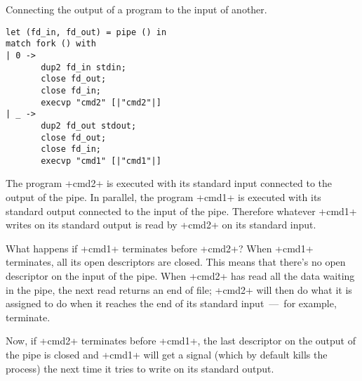 \begin{example} Connecting the output of a program to the input of another.
%
\begin{lstlisting}
let (fd_in, fd_out) = pipe () in
match fork () with
| 0 -> 
       dup2 fd_in stdin;
       close fd_out;
       close fd_in;
       execvp "cmd2" [|"cmd2"|]
| _ -> 
       dup2 fd_out stdout;
       close fd_out;
       close fd_in;
       execvp "cmd1" [|"cmd1"|]
\end{lstlisting}
%
The program \ml+cmd2+ is executed with its standard input connected to
the output of the pipe. In parallel, the program \ml+cmd1+ is executed
with its standard output connected to the input of the pipe. Therefore
whatever \ml+cmd1+ writes on its standard output is read by \ml+cmd2+
on its standard input.

What happens if \ml+cmd1+ terminates before \ml+cmd2+? When \ml+cmd1+
terminates, all its open descriptors are closed.  This means that there's no
open descriptor on the input of the pipe. When \ml+cmd2+ has read all
the data waiting in the pipe, the next read returns an end of file;
\ml+cmd2+ will then do what it is assigned to do when it reaches the
end of its standard input~---~for example, terminate. 


Now,  if \ml+cmd2+ terminates before \ml+cmd1+, the last descriptor on
the output of the pipe is closed and \ml+cmd1+ will get
a signal (which by default kills the process) the next time
it tries to write on its standard output. 


\end{example}

